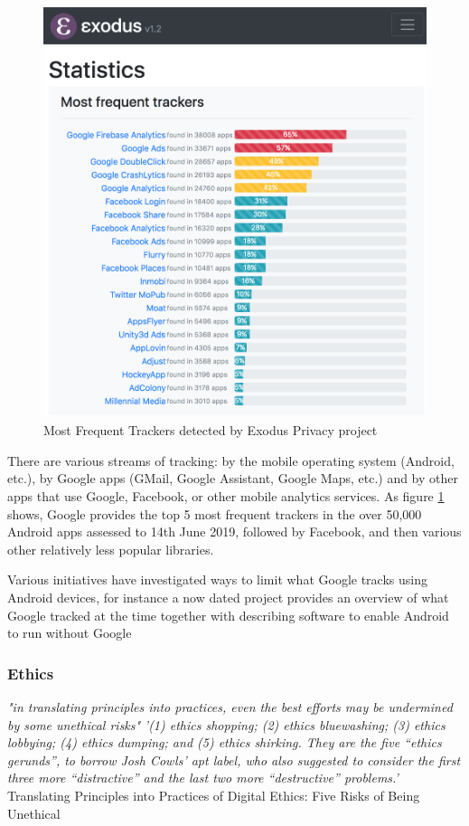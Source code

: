 \begin{figure}
    \centering
    \includegraphics[width=\textwidth, height=\textheight, keepaspectratio]{images/exodus_most_frequent_trackers_14_jun_2019.png}
    \caption{Most Frequent Trackers detected by Exodus Privacy project}
    \label{fig:exodus_most_frequent_trackers}
\end{figure}

There are various streams of tracking: by the mobile operating system (Android, etc.), by Google apps (GMail, Google Assistant, Google Maps, etc.) and by other apps that use Google, Facebook, or other mobile analytics services. As figure \ref{fig:exodus_most_frequent_trackers} shows, Google provides the top 5 most frequent trackers in the over 50,000 Android apps assessed to 14th June 2019, followed by Facebook, and then various other relatively less popular libraries.

Various initiatives have investigated ways to limit what Google tracks using Android devices, for instance a now dated project provides an overview of what Google tracked at the time together with describing software to enable Android to run without Google\cite{izzy_android_without_google_microg_2015} 

\subsubsection{Ethics}

\textit{"in translating principles into practices, even the best efforts may be undermined by some unethical risks"} \textit{'(1) ethics shopping; (2) ethics bluewashing; (3) ethics lobbying; (4) ethics dumping; and (5) ethics shirking. They are the five “ethics gerunds”, to borrow Josh Cowls’ apt label, who also suggested to consider the first three more “distractive” and the last two more “destructive” problems.'} Translating Principles into Practices of Digital Ethics: Five Risks of Being Unethical\cite{Floridi2019}
